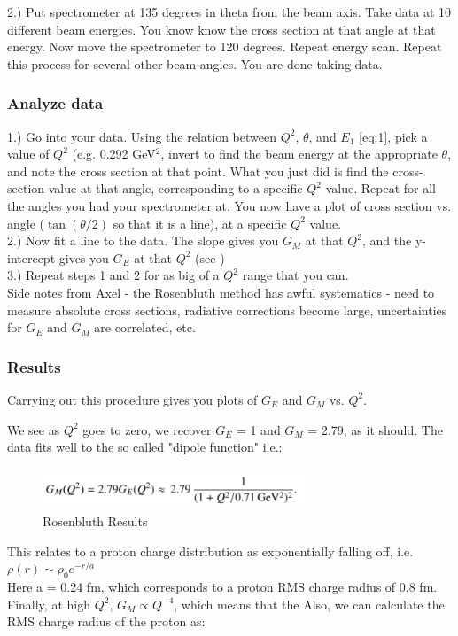                 2.) Put spectrometer at 135 degrees in theta from the beam axis. Take data at 10 different beam energies. You know know the cross section at that angle at that energy. Now move the spectrometer to 120 degrees. Repeat energy scan. Repeat this process for several other beam angles. You are done taking data.
            \subsubsection{Analyze data}
                1.) Go into your data. Using the relation between $Q^2$, $\theta$, and $E_1$ \eqref{eq:1}, pick a value of $Q^2$ (e.g. 0.292 GeV$^2$, invert to find the beam energy at the appropriate $\theta$, and note the cross section at that point. What you just did is find the cross-section value at that angle, corresponding to a specific $Q^2$ value. Repeat for all the angles you had your spectrometer at. You now have a plot of cross section vs. angle ($\tan(\theta/2)$ so that it is a line), at a specific $Q^2$ value. \\
                2.) Now fit a line to the data. The slope gives you $G_M$ at that $Q^2$, and the y-intercept gives you $G_E$ at that $Q^2$ (see \label{eq:1})\\
                3.) Repeat steps 1 and 2 for as big of a $Q^2$ range that you can. \\
                \newline
                Side notes from Axel - the Rosenbluth method has awful systematics - need to measure absolute cross sections, radiative corrections become large, uncertainties for $G_E$ and $G_M$ are correlated, etc.
            \subsubsection{Results}
                Carrying out this procedure gives you plots of $G_E$ and $G_M$ vs. $Q^2$. 
                
                We see as $Q^2$ goes to zero, we recover $G_E$ = 1 and $G_M$ = 2.79, as it should. The data fits well to the so called "dipole function" i.e.:
                \begin{figure}[H]
                    \centering
                    \includegraphics[width=8cm]{NuclearPhysics/modules/lepton-scattering/pics/elastic-ep/dipole.PNG}
                    \caption{Rosenbluth Results}
                \end{figure}
                This relates to a proton charge distribution as exponentially falling off, i.e.\\
                $\rho(r) \sim \rho_0 e^{-r/a}$\\
                Here a = 0.24 fm, which corresponds to a proton RMS charge radius of 0.8 fm. \\
                Finally, at high $Q^2$, $G_M \propto Q^{-4}$, which means that the 
                Also, we can calculate the RMS charge radius of the proton as:
                
